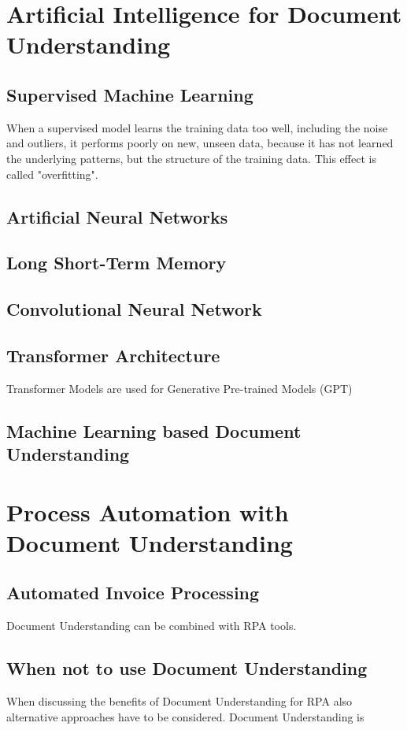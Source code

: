 \section{Artificial Intelligence for Document Understanding}
\subsection{Supervised Machine Learning}

When a supervised model learns the training data too well, including the noise and outliers, it performs poorly on new, unseen data, because it has not learned the underlying patterns, but the structure of the training data. This effect is called "overfitting".
\subsection{Artificial Neural Networks}
\subsection{Long Short-Term Memory}
\subsection{Convolutional Neural Network}
\subsection{Transformer Architecture}
\label{Transformer}
Transformer Models are used for Generative Pre-trained Models (GPT)
\subsection{Machine Learning based Document Understanding}
\section{Process Automation with Document Understanding}
\subsection{Automated Invoice Processing}
Document Understanding can be combined with \ac{RPA} tools.
\subsection{When not to use Document Understanding}
When discussing the benefits of Document Understanding for \ac{RPA} also alternative approaches have to be considered. Document Understanding is 